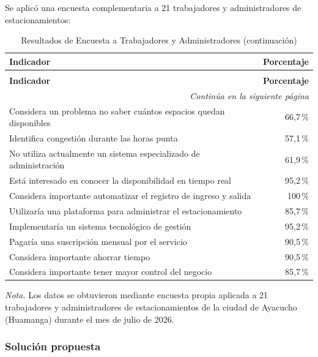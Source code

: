 Se aplicó una encuesta complementaria a 21 trabajadores y administradores de estacionamientos:

\begin{longtable}{p{11cm} r}
\caption{Resultados de Encuesta a Trabajadores y Administradores} \\
\toprule
\textbf{Indicador} & \textbf{Porcentaje} \\
\midrule
\endfirsthead

\caption[]{Resultados de Encuesta a Trabajadores y Administradores (continuación)} \\
\toprule
\textbf{Indicador} & \textbf{Porcentaje} \\
\midrule
\endhead

\midrule
\multicolumn{2}{r}{\footnotesize\textit{Continúa en la siguiente página}} \\
\endfoot

\bottomrule
\endlastfoot

Considera un problema no saber cuántos espacios quedan disponibles & 66,7\,\% \\
Identifica congestión durante las horas punta & 57,1\,\% \\
No utiliza actualmente un sistema especializado de administración & 61,9\,\% \\
Está interesado en conocer la disponibilidad en tiempo real & 95,2\,\% \\
Considera importante automatizar el registro de ingreso y salida & 100\,\% \\
Utilizaría una plataforma para administrar el estacionamiento & 85,7\,\% \\
Implementaría un sistema tecnológico de gestión & 95,2\,\% \\
Pagaría una suscripción mensual por el servicio & 90,5\,\% \\
Considera importante ahorrar tiempo & 90,5\,\% \\
Considera importante tener mayor control del negocio & 85,7\,\% \\
\end{longtable}

\textit{Nota.} Los datos se obtuvieron mediante encuesta propia aplicada a 21 trabajadores y administradores de estacionamientos de la ciudad de Ayacucho (Huamanga) durante el mes de julio de 2026.

\newpage\subsubsection{Solución propuesta}

